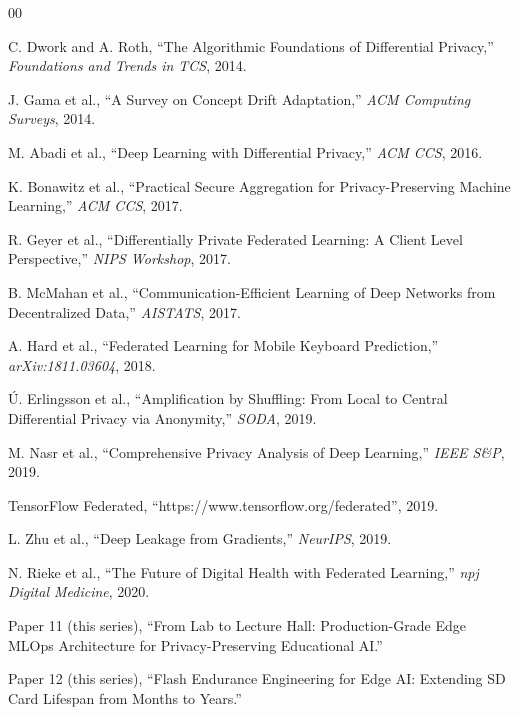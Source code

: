 \documentclass[conference]{IEEEtran}
\begin{document}
\begin{thebibliography}{00}

 C. Dwork and A. Roth, ``The Algorithmic Foundations of Differential Privacy,'' \textit{Foundations and Trends in TCS}, 2014.

 J. Gama et al., ``A Survey on Concept Drift Adaptation,'' \textit{ACM Computing Surveys}, 2014.

 M. Abadi et al., ``Deep Learning with Differential Privacy,'' \textit{ACM CCS}, 2016.

 K. Bonawitz et al., ``Practical Secure Aggregation for Privacy-Preserving Machine Learning,'' \textit{ACM CCS}, 2017.

 R. Geyer et al., ``Differentially Private Federated Learning: A Client Level Perspective,'' \textit{NIPS Workshop}, 2017.

 B. McMahan et al., ``Communication-Efficient Learning of Deep Networks from Decentralized Data,'' \textit{AISTATS}, 2017.

 A. Hard et al., ``Federated Learning for Mobile Keyboard Prediction,'' \textit{arXiv:1811.03604}, 2018.

 Ú. Erlingsson et al., ``Amplification by Shuffling: From Local to Central Differential Privacy via Anonymity,'' \textit{SODA}, 2019.

 M. Nasr et al., ``Comprehensive Privacy Analysis of Deep Learning,'' \textit{IEEE S\&P}, 2019.

 TensorFlow Federated, ``https://www.tensorflow.org/federated'', 2019.

 L. Zhu et al., ``Deep Leakage from Gradients,'' \textit{NeurIPS}, 2019.

 N. Rieke et al., ``The Future of Digital Health with Federated Learning,'' \textit{npj Digital Medicine}, 2020.

 Paper 11 (this series), ``From Lab to Lecture Hall: Production-Grade Edge MLOps Architecture for Privacy-Preserving Educational AI.''

 Paper 12 (this series), ``Flash Endurance Engineering for Edge AI: Extending SD Card Lifespan from Months to Years.''

\end{thebibliography}
\end{document}
